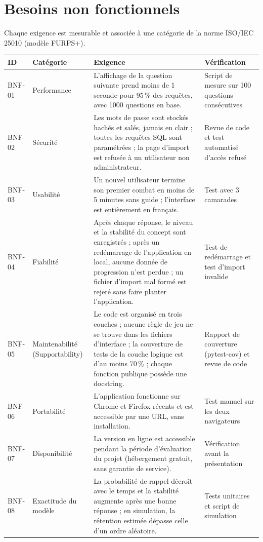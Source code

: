\documentclass[11pt,a4paper]{article}
\begin{document}
\section{Besoins non fonctionnels}

Chaque exigence est mesurable et associ\'ee \`a une cat\'egorie de la norme ISO/IEC 25010 (mod\`ele FURPS+).

{\small
\begin{longtable}{L{1.3cm}L{2.6cm}L{6.7cm}L{3.6cm}}
\toprule
\textbf{ID} & \textbf{Cat\'egorie} & \textbf{Exigence} & \textbf{V\'erification}\\
\midrule
\endhead
BNF-01 & Performance & L'affichage de la question suivante prend moins de 1 seconde pour 95\,\% des requ\^etes, avec 1000 questions en base. & Script de mesure sur 100 questions cons\'ecutives\\
\addlinespace
BNF-02 & S\'ecurit\'e & Les mots de passe sont stock\'es hach\'es et sal\'es, jamais en clair ; toutes les requ\^etes SQL sont param\'etr\'ees ; la page d'import est refus\'ee \`a un utilisateur non administrateur. & Revue de code et test automatis\'e d'acc\`es refus\'e\\
\addlinespace
BNF-03 & Usabilit\'e & Un nouvel utilisateur termine son premier combat en moins de 5 minutes sans guide ; l'interface est enti\`erement en fran\c{c}ais. & Test avec 3 camarades\\
\addlinespace
BNF-04 & Fiabilit\'e & Apr\`es chaque r\'eponse, le niveau et la stabilit\'e du concept sont enregistr\'es ; apr\`es un red\'emarrage de l'application en local, aucune donn\'ee de progression n'est perdue ; un fichier d'import mal form\'e est rejet\'e sans faire planter l'application. & Test de red\'emarrage et test d'import invalide\\
\addlinespace
BNF-05 & Maintenabilit\'e (Supportability) & Le code est organis\'e en trois couches ; aucune r\`egle de jeu ne se trouve dans les fichiers d'interface ; la couverture de tests de la couche logique est d'au moins 70\,\% ; chaque fonction publique poss\`ede une docstring. & Rapport de couverture (pytest-cov) et revue de code\\
\addlinespace
BNF-06 & Portabilit\'e & L'application fonctionne sur Chrome et Firefox r\'ecents et est accessible par une URL, sans installation. & Test manuel sur les deux navigateurs\\
\addlinespace
BNF-07 & Disponibilit\'e & La version en ligne est accessible pendant la p\'eriode d'\'evaluation du projet (h\'ebergement gratuit, sans garantie de service). & V\'erification avant la pr\'esentation\\
\addlinespace
BNF-08 & Exactitude du mod\`ele & La probabilit\'e de rappel d\'ecro\^it avec le temps et la stabilit\'e augmente apr\`es une bonne r\'eponse ; en simulation, la r\'etention estim\'ee d\'epasse celle d'un ordre al\'eatoire. & Tests unitaires et script de simulation\\
\bottomrule
\end{longtable}
}
\end{document}
